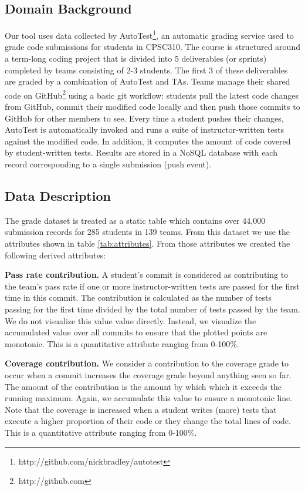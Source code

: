 \documentclass[../manifest.tex]{subfiles}
\begin{document}
\subsection{Domain Background}
Our tool uses data collected by AutoTest\footnote{http://github.com/nickbradley/autotest},
an automatic grading service used to grade code submissions for students in
CPSC310. The course is structured around a term-long coding project that is
divided into 5 deliverables (or sprints) completed by teams consisting of 2-3 students.
The first 3 of these deliverables are graded by a combination of AutoTest and TAs.
Teams manage their shared code on GitHub\footnote{http://github.com}
using a basic git workflow: students pull the latest code changes from GitHub,
commit their modified code locally and then push those commits to GitHub for
other members to see. Every time a student pushes their changes, AutoTest is
automatically invoked and runs a suite of instructor-written tests against the modified
code. In addition, it computes the amount of code covered by student-written tests. Results are stored in a NoSQL database with each record corresponding to a
single submission (push event).


\subsection{Data Description} \label{ssec:data-description}
The grade dataset is treated as a static table which contains over 44,000 submission records for 285 students in 139 teams. From this dataset we use the attributes shown in table \ref{tab:attributes}. From those attributes we created the following derived attributes:

\textbf{Pass rate contribution.} A student's commit is considered as contributing to the team's pass rate if one or more instructor-written tests are passed for the first time in this commit. The contribution is calculated as the number of tests passing for the first time divided by the total number of tests passed by the team. We do not visualize this value value directly. Instead, we visualize the accumulated value over all commits to ensure that the plotted points are monotonic. This is a quantitative attribute ranging from 0-100\%.

\textbf{Coverage contribution.} We consider a contribution to the coverage grade to occur when a commit increases the coverage grade beyond anything seen so far. The amount of the  contribution is the amount by which which it exceeds the running maximum. Again, we accumulate this value to ensure a monotonic line. Note that the coverage is increased when a student writes (more) tests that execute a higher proportion of their code or they change the total lines of code. This is a quantitative attribute ranging from 0-100\%.
\end{document}

